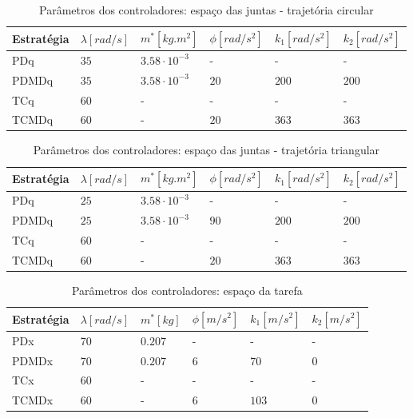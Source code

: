 \documentclass[]{politex}
\begin{document}
\begin{table}[H] 
\centering
\caption{Parâmetros dos controladores: espaço das juntas - trajetória circular}
\label{tab:parametrosControleAtuadoresCirculo}
\begin{tabular}{l|l|l|l|l|l}
Estratégia & $\lambda [rad/s]$  & $m^*[kg.m^2]$ & $\phi[rad/s^2]$   & $k_1[rad/s^2]$ & $k_2[rad/s^2]$ \\ \hline
PDq        & $35$               & $3.58 \cdot 10^{-3}$  & -         & -              & -              \\
PDMDq      & $35$               & $3.58 \cdot 10^{-3}$  & $20$      & $200$          & $200$          \\
TCq        & $60$               & -                     & -         & -              & -              \\
TCMDq      & $60$               & -                     & $20$      & $363$          & $363$          \\
\end{tabular}
\end{table}

\begin{table}[H] 
\centering
\caption{Parâmetros dos controladores: espaço das juntas - trajetória triangular}
\label{tab:parametrosControleAtuadoresTriangulo}
\begin{tabular}{l|l|l|l|l|l}
Estratégia & $\lambda [rad/s]$  & $m^*[kg.m^2]$         & $\phi[rad/s^2]$   & $k_1[rad/s^2]$ & $k_2[rad/s^2]$ \\ \hline
PDq        & $25$               & $3.58 \cdot 10^{-3}$  & -         & -              & -              \\
PDMDq      & $25$               & $3.58 \cdot 10^{-3}$  & $90$      & $200$          & $200$          \\
TCq        & $60$               & -                     & -         & -              & -              \\
TCMDq      & $60$               & -                     & $20$      & $363$          & $363$          \\
\end{tabular}
\end{table}

\begin{table}[H] 
\centering
\caption{Parâmetros dos controladores: espaço da tarefa}
\label{tab:parametrosControleEfetuador}
\begin{tabular}{l|l|l|l|l|l}
Estratégia & $\lambda [rad/s]$  & $m^*[kg]$ & $\phi[m/s^2]$ & $k_1[m/s^2]$ & $k_2[m/s^2]$ \\ \hline
PDx        & $70$               & $0.207$   & -             & -            & -            \\
PDMDx      & $70$               & $0.207$   & $6$           & $70$         & $0$          \\
TCx        & $60$               & -         & -             & -            & -            \\
TCMDx      & $60$               & -         & $6$           & $103$        & $0$          \\
\end{tabular}
\end{table}
\end{document}
